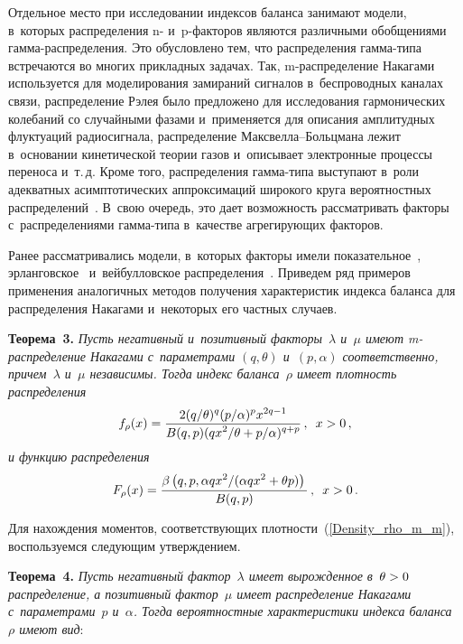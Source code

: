 \begin{multicols}{2}
Отдельное место при исследовании индексов баланса занимают модели, в~которых
 распределения n- и~p-фак\-то\-ров являются различными обобщениями гам\-ма-рас\-пре\-де\-ле\-ния. 
 Это обусловлено тем, что распределения гам\-ма-ти\-па встречаются во многих 
 прикладных задачах. Так, m-рас\-пре\-де\-ле\-ние 
 Накагами используется для моделирования замираний сигналов в~беспроводных каналах 
 связи, распределение Рэлея было предложено для исследования гармонических колебаний 
 со случайными фазами и~применяется для описания амплитудных флуктуаций радиосигнала, 
 распределение Макс\-вел\-ла--Больц\-ма\-на лежит в~основании кинетической тео\-рии 
 газов и~описывает электронные процессы переноса и~т.\,д. Кроме того, распределения 
 гам\-ма-ти\-па выступают в~роли адекватных асимптотических аппроксимаций 
 широкого круга вероятностных распределений~\cite{ZaKo2013}. В~свою очередь, 
 это дает возможность рассматривать факторы с~распределениями гам\-ма-ти\-па 
 в~качестве агрегирующих факторов.

Ранее рассматривались модели, в~которых факторы имели показательное~\cite{KuSh2009},
 эрланговское~\cite{KuShSh2009}  и~вейбулловское распределения~\cite{KuTi2016,KuTi2017}. 
 Приведем ряд примеров применения аналогичных методов получения характеристик 
 индекса баланса для распределения Накагами и~некоторых его частных случаев.
 
 \smallskip
 
 \noindent
 \textbf{Теорема~3.}
\textit{Пусть негативный и~позитивный факторы~$\lambda$ и~$\mu$ 
имеют m-рас\-пре\-де\-ле\-ние Накагами с~па\-ра\-мет\-ра\-ми $(q, \theta)$
 и~$(p, \alpha)$ соответственно, причем~$\lambda$ и~$\mu$ независимы. 
 Тогда индекс баланса~$\rho$ имеет плот\-ность распределения}
\begin{equation}
\label{Density_rho_m_m}
f_\rho(x)=\displaystyle\frac{\displaystyle 2(q/\theta)^q(p/\alpha)^p  x^{2q-1}\mathstrut}{\displaystyle B(q,p) (q x^2/\theta+p/\alpha)^{q+p}\mathstrut}\,,\enskip x>0\,,
\end{equation}
\textit{и функцию распределения}
$$
F_\rho(x)=\displaystyle\frac{\displaystyle \beta\left(q,p,\alpha qx^2/(\alpha qx^2+\theta p)\right)\mathstrut}{\displaystyle B(q,p)\mathstrut}\,,\enskip 
x>0\,.
$$


Для нахождения моментов, соответствующих плотности~(\ref{Density_rho_m_m}), 
воспользуемся следующим утверж\-де\-нием.

\smallskip

\noindent
\textbf{Теорема~4.}
\textit{Пусть негативный фактор~$\lambda$ имеет вырожденное в~$\theta\hm>0$ 
распределение, а позитивный фактор~$\mu$ имеет распределение Накагами 
с~па\-ра\-мет\-ра\-ми~$p$ и~$\alpha$. Тогда вероятностные характеристики индекса баланса~$\rho$ 
имеют вид}:


\end{multicols}
